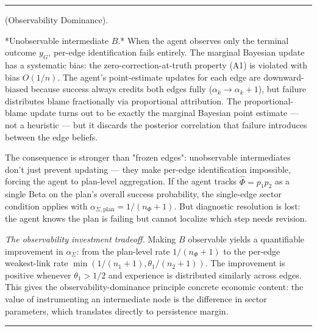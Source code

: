 \documentclass[11pt,oneside]{article}
\newcounter{claim}[section]
\renewcommand{\theclaim}{\thesection.\arabic{claim}}
\newenvironment{segment}[2]{%
  \refstepcounter{claim}%
  \bigskip\noindent\hrule\smallskip
  \noindent{\bfseries #1~\theclaim}\enskip(#2).\par\smallskip
  \noindent\ignorespaces
}{%
  \par\smallskip\noindent\hrule\bigskip
}
\newenvironment{proposition}[1][]{\begin{segment}{Proposition}{#1}}{\end{segment}}
\begin{document}
\begin{proposition}[Observability Dominance]
*Unobservable intermediate $B$.* When the agent observes only the terminal outcome $y_G$, per-edge identification fails entirely. The marginal Bayesian update has a systematic bias: the zero-correction-at-truth property (A1) is violated with bias $O(1/n)$. The agent's point-estimate updates for each edge are downward-biased because success always credits both edges fully ($\alpha_k \to \alpha_k + 1$), but failure distributes blame fractionally via proportional attribution. The proportional-blame update turns out to be exactly the marginal Bayesian point estimate — not a heuristic — but it discards the posterior correlation that failure introduces between the edge beliefs.

The consequence is stronger than "frozen edges": unobservable intermediates don't just prevent updating — they make per-edge identification impossible, forcing the agent to plan-level aggregation. If the agent tracks $\hat{\Phi} = p_1 p_2$ as a single Beta on the plan's overall success probability, the single-edge sector condition applies with $\alpha_{\Sigma,\text{plan}} = 1/(n_\Phi + 1)$. But diagnostic resolution is lost: the agent knows the plan is failing but cannot localize which step needs revision.

\textit{The observability investment tradeoff.} Making $B$ observable yields a quantifiable improvement in $\alpha_\Sigma$: from the plan-level rate $1/(n_\Phi+1)$ to the per-edge weakest-link rate $\min(1/(n_1+1), \theta_1/(n_2+1))$. The improvement is positive whenever $\theta_1 > 1/2$ and experience is distributed similarly across edges. This gives the observability-dominance principle concrete economic content: the value of instrumenting an intermediate node is the difference in sector parameters, which translates directly to persistence margin.

\end{proposition}
\end{document}
